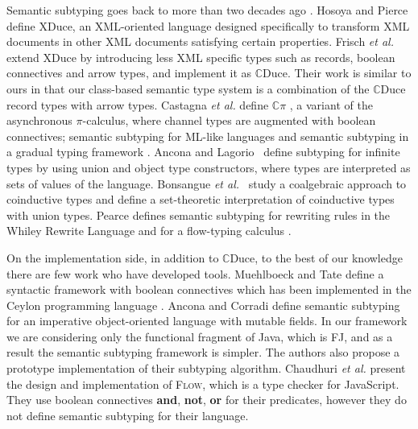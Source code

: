 \documentclass[runningheads]{llncs}
\begin{document}
Semantic subtyping goes back to more than two decades ago \cite{Aiken,Damm}.
%
Hosoya and Pierce \cite{XML1,XML2,XML3} define XDuce, an XML-oriented language designed specifically to transform XML documents in other XML documents satisfying certain properties.
%
Frisch \emph{et al.} \cite{FCB08} extend XDuce by introducing less XML specific types such as records, boolean connectives and arrow types, and implement it as $\mathbb{C}$Duce. Their work is similar to ours in that our class-based semantic type system is a combination of the $\mathbb{C}$Duce record types with arrow types.
%
Castagna \emph{et al.} define $\mathbb{C}\pi$ \cite{Cpi}, a variant of the asynchronous $\pi$-calculus, where channel types are augmented with boolean connectives;
semantic subtyping for ML-like languages \cite{CastagnaP016} and semantic subtyping in a gradual typing framework \cite{CastagnaL17}.
%
Ancona and Lagorio~\cite{AL10} define subtyping for infinite types by using union and object type constructors, where types are interpreted as sets of values of the language.
%
Bonsangue \emph{et al.}~\cite{BRABR14} study a coalgebraic approach to coinductive types and define a set-theoretic interpretation of coinductive types with union types.
%
Pearce \cite{Pearce19} defines semantic subtyping for rewriting rules in the Whiley Rewrite Language and for a flow-typing calculus  \cite{Pearce13}.

On the implementation side, in addition to $\mathbb{C}$Duce, to the best of our knowledge there are few work who have developed tools.
%
Muehlboeck and Tate \cite{Muehlboeck2018} define a syntactic framework with boolean connectives which has been implemented in the Ceylon programming language \cite{Ceylon2016}.
%
Ancona and Corradi \cite{AnconaC16} define semantic subtyping for an imperative object-oriented language with mutable fields. In our framework we are considering only the functional fragment of Java, which is FJ, and as a result the semantic subtyping framework is simpler. The authors also propose a prototype implementation of their subtyping algorithm.
%
Chaudhuri \emph{et al.} \cite{ChaudhuriVGRL17} present the design and implementation of \textsc{Flow}, which is a type checker for JavaScript. They use boolean connectives \textbf{and}, \textbf{not}, \textbf{or} for their predicates, however they do not define semantic subtyping for their language.



\end{document}
